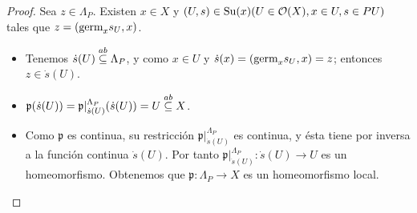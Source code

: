 \begin{proof}
   Sea $z\in\Lambda_P$. Existen $x\in X$ y $(U,s)\in\normalfont{\text{Su}}(x) (U\in\mathcal{O}(X),x\in U,s\in PU)$ tales que $z=(\normalfont{\text{germ}}_{x}s_{U},x)$.
   \begin{itemize}
      \item Tenemos $\dot{s}(U)\stackrel{ab}{\subseteq} \Lambda_P$, y como $x\in U$ y $\dot{s}(x)=(\normalfont{\text{germ}}_{x}s_{U},x)=z$; entonces $z\in\dot{s}(U)$.
      \item $\mathfrak{p}(\dot{s}(U))=\mathfrak{p}|^{\Lambda_P}_{\dot{s}(U)}(\dot{s}(U))=U\stackrel{ab}{\subseteq} X$.
      \item Como $\mathfrak{p}$ es continua, su restricción $\mathfrak{p}|^{\Lambda_P}_{\dot{s}(U)}$ es continua, y ésta tiene por inversa a la función continua $\dot{s}(U)$. Por tanto $\mathfrak{p}|^{\Lambda_P}_{\dot{s}(U)}:\dot{s}(U)\to U$ es un homeomorfismo.
      Obtenemos que $\mathfrak{p}:\Lambda_P\to X$ es un homeomorfismo local.
   \end{itemize}
\end{proof}

